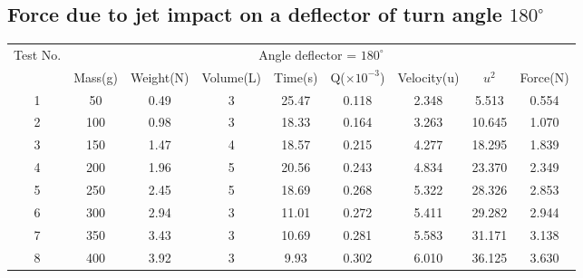 \documentclass[12pt,a4paper]{article}
\begin{document}
\subsection{Force due to jet impact on a deflector of turn angle $180^{\circ}$}
\begin{table}[ht]


\begin{flushleft}
\begin{tabular}{ |c|c|c|c|c|c|c|c|c| } 
\hline

 \multirow{2}{*}{Test No.} & \multicolumn{8}{c|}{Angle deflector = $180^{\circ}$ } \\ \cline{2-9}
                           & Mass(g)& Weight(N) & Volume(L) & Time(s) & Q($\times10 ^{-3}$) & Velocity(u) & $u^2$ & Force(N)\\ \hline
 1                         & 50 & 0.49 & 3 & 25.47 & 0.118 & 2.348 & 5.513 & 0.554  \\ \hline
 2                         & 100 & 0.98 & 3 & 18.33 & 0.164 & 3.263 & 10.645 & 1.070 \\ \hline
 3                         & 150 & 1.47 & 4 & 18.57 & 0.215 & 4.277 & 18.295 & 1.839\\ \hline
 4                         & 200 & 1.96 & 5 & 20.56 & 0.243 & 4.834 & 23.370 & 2.349\\ \hline
 5                         & 250 & 2.45 & 5 & 18.69 & 0.268 & 5.322 & 28.326 & 2.853 \\ \hline
 6                         & 300 & 2.94 & 3 & 11.01 & 0.272 & 5.411 & 29.282 & 2.944 \\ \hline
 7                         & 350 & 3.43 & 3 & 10.69 & 0.281 & 5.583 & 31.171 & 3.138 \\ \hline
 8                         & 400 & 3.92 & 3 & 9.93 & 0.302 & 6.010 & 36.125 & 3.630 \\ \hline
\end{tabular}
\end{flushleft}
\end{table}
\end{document}
